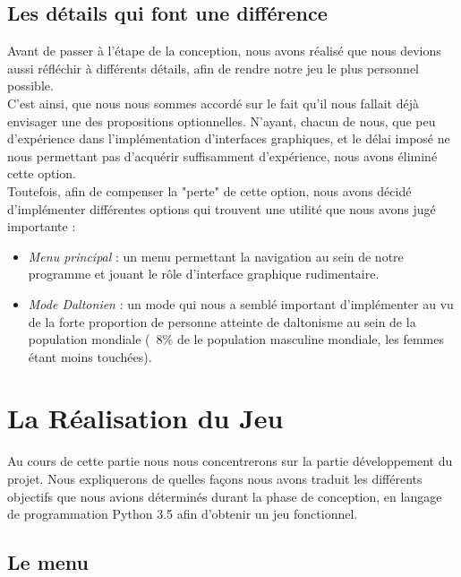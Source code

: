 \subsection{Les détails qui font une différence}

Avant de passer à l'étape de la conception, nous avons réalisé que nous devions aussi réfléchir à différents détails, afin de rendre notre jeu le plus personnel possible.
\\C'est ainsi, que nous nous sommes accordé sur le fait qu'il nous fallait déjà envisager une des propositions optionnelles. N'ayant, chacun de nous, que peu d'expérience dans l'implémentation d'interfaces graphiques, et le délai imposé ne nous permettant pas d'acquérir suffisamment d'expérience, nous avons éliminé cette option.
\\Toutefois, afin de compenser la "perte" de cette option, nous avons décidé d'implémenter différentes options qui trouvent une utilité que nous avons jugé importante :

\begin{itemize}
	\item \emph{Menu principal} : un menu permettant la navigation au sein de notre programme et jouant le rôle d'interface graphique rudimentaire.
	\item \emph{Mode Daltonien} : un mode qui nous a semblé important d'implémenter au vu de la forte proportion de personne atteinte de daltonisme au sein de la population mondiale (~8\% de le population masculine mondiale, les femmes étant moins touchées).
\end{itemize}

\newpage
\section{La Réalisation du Jeu}

Au cours de cette partie nous nous concentrerons sur la partie développement du projet. Nous expliquerons de quelles façons nous avons traduit les différents objectifs que nous avions déterminés durant la phase de conception, en langage de programmation Python 3.5 afin d'obtenir un jeu fonctionnel.

\subsection{Le menu }


